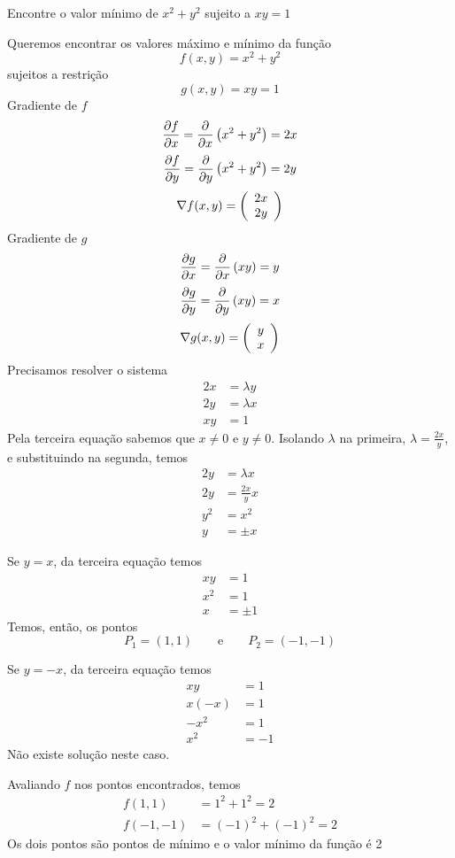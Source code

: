 \documentclass[a4paper,12pt,fleqn]{article}
\begin{document}
Encontre o valor mínimo de
\(
  x^2 + y^2
\)
sujeito a
\(
  xy = 1
\)
\clearpagequestiononly

\begin{answer}
\setlength\columnsep{3em}
\begin{multicols}{2}
\raggedcolumns
  Queremos encontrar os valores máximo e mínimo da função
  \[
    f(x,y) = x^2 + y^2
  \]
  sujeitos a restrição
  \[
    g(x, y) = xy = 1
  \]
  Gradiente de $f$
  \[
    \frac{\partial {f}}{\partial {x}}
    = \frac{\partial {}}{\partial {x}}\left(x^2 + y^2\right)
    = 2x
  \]
  \[
    \frac{\partial {f}}{\partial {y}}
    = \frac{\partial {}}{\partial {y}}\left(x^2 + y^2\right)
    = 2y
  \]
  \[
    \nabla f(x, y) = \left(\begin{array}{c} 2x \\ 2y \end{array}\right)
  \]
  Gradiente de $g$
  \[
    \frac{\partial {g}}{\partial {x}}
    = \frac{\partial {}}{\partial {x}}\left(xy\right)
    = y
  \]
  \[
    \frac{\partial {g}}{\partial {y}}
    = \frac{\partial {}}{\partial {y}}\left(xy\right)
    = x
  \]
  \[
    \nabla g(x, y) = \left(\begin{array}{c} y \\ x \end{array}\right)
  \]
  Precisamos resolver o sistema
  \begin{align*}
    2x & = \lambda y \\
    2y & = \lambda x \\
    xy & = 1
  \end{align*}
  Pela terceira equação sabemos que $x\neq 0$ e $y\neq 0$.
  Isolando $\lambda$ na primeira, \(\lambda = \frac{2x}{y}\),
  e substituindo na segunda, temos
  \begin{align*}
    2y  & = \lambda x      \\
    2y  & = \frac{2x}{y} x \\
    y^2 & = x^2            \\
    y   & = \pm x
  \end{align*}

  Se $y=x$, da terceira equação temos
  \begin{align*}
    xy  & = 1     \\
    x^2 & = 1     \\
    x   & = \pm 1
  \end{align*}
  Temos, então, os pontos
  \[
    P_1 = (1, 1)
    \qquad\text{e}\qquad
    P_2 = (-1, -1)
  \]

  Se $y=-x$, da terceira equação temos
  \begin{align*}
    xy    & = 1   \\
    x(-x) & = 1   \\
    -x^2  & = 1   \\
    x^2   & = - 1
  \end{align*}
  Não existe solução neste caso.

  Avaliando $f$ nos pontos encontrados, temos
  \begin{align*}
    f(1, 1)   & = 1^2 + 1^2 = 2      \\
    f(-1, -1) & = (-1)^2 + (-1)^2= 2
  \end{align*}
  Os dois pontos são pontos de mínimo e o valor mínimo da função é 2
\end{multicols}
\end{answer}

\end{document}
